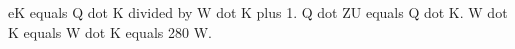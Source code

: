 eK equals Q dot K divided by W dot K plus 1.  
Q dot ZU equals Q dot K.  
W dot K equals W dot K equals 280 W.